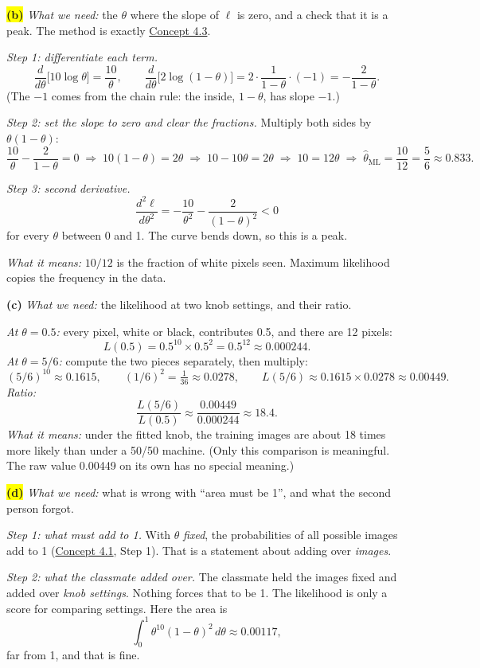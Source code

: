 \documentclass[12pt,a4paper]{article}
\begin{document}
\colorbox{yellow}{\textbf{(b)}} \emph{What we need:} the $\theta$ where the slope of $\ell$ is zero, and a check that it is a peak. The method is exactly \hyperref[c4-3]{Concept 4.3}.

\emph{Step 1: differentiate each term.}
\[
\frac{d}{d\theta}\big[10\log\theta\big]=\frac{10}{\theta},\qquad
\frac{d}{d\theta}\big[2\log(1-\theta)\big]=2\cdot\frac{1}{1-\theta}\cdot(-1)=-\frac{2}{1-\theta}.
\]
(The $-1$ comes from the chain rule: the inside, $1-\theta$, has slope $-1$.)

\emph{Step 2: set the slope to zero and clear the fractions.} Multiply both sides by $\theta(1-\theta)$:
\[
\frac{10}{\theta}-\frac{2}{1-\theta}=0
\;\Rightarrow\;10(1-\theta)=2\theta
\;\Rightarrow\;10-10\theta=2\theta
\;\Rightarrow\;10=12\theta
\;\Rightarrow\;\hat\theta_{\text{ML}}=\frac{10}{12}=\frac56\approx0.833 .
\]

\emph{Step 3: second derivative.}
\[
\frac{d^2\ell}{d\theta^2}=-\frac{10}{\theta^2}-\frac{2}{(1-\theta)^2}<0
\]
for every $\theta$ between 0 and 1. The curve bends down, so this is a peak.

\emph{What it means:} $10/12$ is the fraction of white pixels seen. Maximum likelihood copies the frequency in the data.

\textbf{(c)} \emph{What we need:} the likelihood at two knob settings, and their ratio.

\emph{At $\theta=0.5$:} every pixel, white or black, contributes 0.5, and there are 12 pixels:
\[
L(0.5)=0.5^{10}\times0.5^{2}=0.5^{12}\approx0.000244 .
\]
\emph{At $\theta=5/6$:} compute the two pieces separately, then multiply:
\[
(5/6)^{10}\approx0.1615,\qquad (1/6)^2=\tfrac{1}{36}\approx0.0278,\qquad L(5/6)\approx0.1615\times0.0278\approx0.00449 .
\]
\emph{Ratio:}
\[
\frac{L(5/6)}{L(0.5)}\approx\frac{0.00449}{0.000244}\approx18.4 .
\]
\emph{What it means:} under the fitted knob, the training images are about 18 times more likely than under a 50/50 machine. (Only this comparison is meaningful. The raw value 0.00449 on its own has no special meaning.)

\colorbox{yellow}{\textbf{(d)}} \emph{What we need:} what is wrong with ``area must be 1'', and what the second person forgot.

\emph{Step 1: what must add to 1.} With $\theta$ \emph{fixed}, the probabilities of all possible images add to 1 (\hyperref[c4-1]{Concept 4.1}, Step 1). That is a statement about adding over \emph{images}.

\emph{Step 2: what the classmate added over.} The classmate held the images fixed and added over \emph{knob settings}. Nothing forces that to be 1. The likelihood is only a score for comparing settings. Here the area is
\[
\int_0^1\theta^{10}(1-\theta)^2\,d\theta\approx0.00117,
\]
far from 1, and that is fine.
\end{document}
